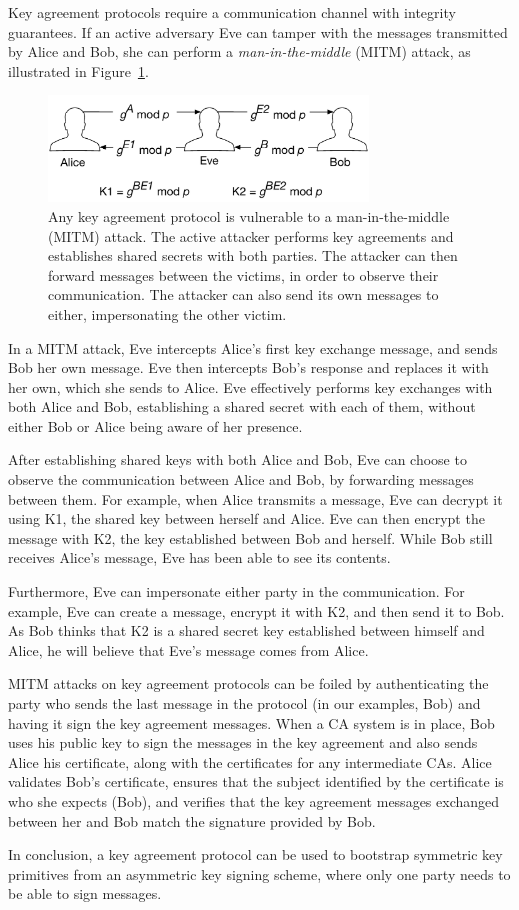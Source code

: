 Key agreement protocols require a communication channel with integrity
guarantees. If an active adversary Eve can tamper with the messages transmitted
by Alice and Bob, she can perform a \textit{man-in-the-middle} (MITM) attack,
as illustrated in Figure~\ref{fig:key_agreement_mitm}.

\begin{figure}[hbt]
  \centering
  \includegraphics[width=85mm]{figures/key_agreement_mitm.pdf}
  \caption{
    Any key agreement protocol is vulnerable to a man-in-the-middle (MITM)
    attack. The active attacker performs key agreements and establishes shared
    secrets with both parties. The attacker can then forward messages between
    the victims, in order to observe their communication. The attacker can also
    send its own messages to either, impersonating the other victim.
  }
  \label{fig:key_agreement_mitm}
\end{figure}

In a MITM attack, Eve intercepts Alice's first key exchange message, and sends
Bob her own message. Eve then intercepts Bob's response and replaces it with
her own, which she sends to Alice. Eve effectively performs key exchanges with
both Alice and Bob, establishing a shared secret with each of them, without
either Bob or Alice being aware of her presence.

After establishing shared keys with both Alice and Bob, Eve can choose to
observe the communication between Alice and Bob, by forwarding messages between
them. For example, when Alice transmits a message, Eve can decrypt it using K1,
the shared key between herself and Alice. Eve can then encrypt the message with
K2, the key established between Bob and herself. While Bob still receives
Alice's message, Eve has been able to see its contents.

Furthermore, Eve can impersonate either party in the communication. For
example, Eve can create a message, encrypt it with K2, and then send it to Bob.
As Bob thinks that K2 is a shared secret key established between himself and
Alice, he will believe that Eve's message comes from Alice.

MITM attacks on key agreement protocols can be foiled by authenticating the
party who sends the last message in the protocol (in our examples, Bob) and
having it sign the key agreement messages. When a CA system is in place, Bob
uses his public key to sign the messages in the key agreement and also sends
Alice his certificate, along with the certificates for any intermediate CAs.
Alice validates Bob's certificate, ensures that the subject identified by the
certificate is who she expects (Bob), and verifies that the key agreement
messages exchanged between her and Bob match the signature provided by Bob.

In conclusion, a key agreement protocol can be used to bootstrap symmetric key
primitives from an asymmetric key signing scheme, where only one party needs to
be able to sign messages.


